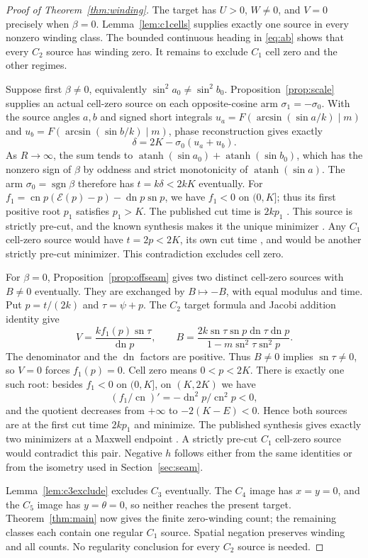 \documentclass[11pt,a4paper]{article}
\theoremstyle{remark}\newtheorem{remark}[theorem]{Remark}
\newcommand{\sn}{\operatorname{sn}}
\newcommand{\cn}{\operatorname{cn}}
\newcommand{\dn}{\operatorname{dn}}
\newcommand{\atanh}{\operatorname{atanh}}
\begin{document}
\begin{proof}[Proof of Theorem~\ref{thm:winding}]
The target has $U>0$, $W\ne0$, and $V=0$ precisely when $\beta=0$.
Lemma~\ref{lem:c1cells} supplies exactly one source in every nonzero
winding class. The bounded continuous heading in \eqref{eq:ab} shows
that every $C_2$ source has winding zero. It remains to exclude $C_1$
cell zero and the other regimes.

Suppose first $\beta\ne0$, equivalently
$\sin^2a_0\ne\sin^2b_0$. Proposition~\ref{prop:scale} supplies an
actual cell-zero source on each opposite-cosine arm
$\sigma_1=-\sigma_0$. With the source angles $a,b$ and signed short
integrals
$u_a=F(\arcsin(\sin a/k)\mid m)$ and
$u_b=F(\arcsin(\sin b/k)\mid m)$, phase reconstruction gives exactly
\[
 \delta=2K-\sigma_0(u_a+u_b).
\]
As $R\to\infty$, the sum tends to
$\atanh(\sin a_0)+\atanh(\sin b_0)$, which has the nonzero sign of
$\beta$ by oddness and strict monotonicity of $\atanh(\sin a)$.
The arm $\sigma_0=\operatorname{sgn}\beta$ therefore has $t=k\delta<2kK$
eventually. For
$f_1=\cn p(\mathcal E(p)-p)-\dn p\sn p$, we have $f_1<0$ on $(0,K]$;
thus its first positive root $p_1$ satisfies $p_1>K$.
The published cut time is $2kp_1$ \cite[(2.2)]{SS}.
This source is strictly pre-cut, and the known synthesis makes it the
unique minimizer \cite[Theorems 3.1--3.2]{SS}.
Any $C_1$ cell-zero source would have $t=2p<2K$, its own cut time
\cite[(2.1)]{SS}, and would be another strictly pre-cut
minimizer. This contradiction excludes cell zero.

For $\beta=0$, Proposition~\ref{prop:offseam} gives two distinct
cell-zero sources with $B\ne0$ eventually. They are exchanged by
$B\mapsto-B$, with equal modulus and time. Put $p=t/(2k)$ and
$\tau=\psi+p$. The $C_2$ target formula and Jacobi addition identity give
\[
 V=\frac{kf_1(p)\sn\tau}{\dn p},\qquad
 B=\frac{2k\sn\tau\sn p\dn\tau\dn p}
 {1-m\sn^2\tau\sn^2p}.
\]
The denominator and the $\dn$ factors are positive. Thus $B\ne0$
implies $\sn\tau\ne0$, so $V=0$ forces $f_1(p)=0$.
Cell zero means $0<p<2K$. There is exactly one such root: besides
$f_1<0$ on $(0,K]$, on $(K,2K)$ we have
\[
 (f_1/\cn)'=-\dn^2p/\cn^2p<0,
\]
and the quotient decreases from $+\infty$ to $-2(K-E)<0$.
Hence both sources are at the first cut time $2kp_1$ and minimize.
The published synthesis gives exactly two minimizers at a Maxwell
endpoint \cite[Theorems 3.2 and 3.4]{SS}. A strictly pre-cut $C_1$
cell-zero source would contradict this pair. Negative $h$ follows
either from the same identities or from the isometry used in Section~\ref{sec:seam}.

Lemma~\ref{lem:c3exclude} excludes $C_3$ eventually. The $C_4$ image
has $x=y=0$, and the $C_5$ image has $y=\theta=0$, so neither reaches
the present target. Theorem~\ref{thm:main} now gives the finite
zero-winding count; the remaining classes each contain one regular
$C_1$ source. Spatial negation preserves winding and all counts.
No regularity conclusion for every $C_2$ source is needed.
\end{proof}
\end{document}
